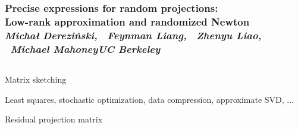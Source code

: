 \documentclass{beamer}
\edef\polishl{\l}
\begin{document}
\begin{frame}
  \frametitle{
    \centering\textrm{\textbf{\LARGE Precise expressions for random
        projections:}}\\
      \centering\textrm{\textbf{\LARGE
      Low-rank approximation and randomized Newton}}\\[-2mm]
\textit{\large Micha{\polishl } Derezi\'{n}ski, \ Feynman Liang,
 \ Zhenyu Liao, \ Michael Mahoney\qquad UC Berkeley}\\[-5mm]
}
\begin{columns}
  \begin{column}{0.28\textwidth}


\begin{block}{Matrix sketching}

    \begin{center}
      
    \end{center}
    Least squares, stochastic optimization, data compression,
    approximate SVD, ...
    \vspace{5mm}
 \end{block}
    

\begin{block}{Residual projection matrix}

    \begin{center}      
        \begin{tikzpicture}[scale=1.4]


\end{tikzpicture}
\end{center}
\end{block}
\end{column}
\end{columns}
\end{frame}
\end{document}
